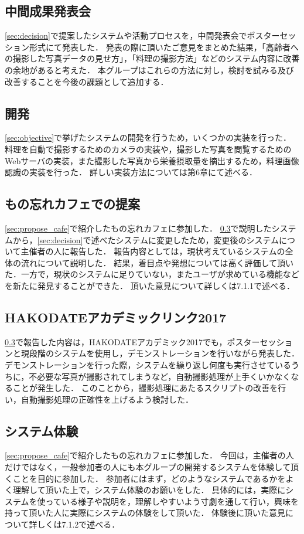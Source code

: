 \documentclass[../report]{subfiles}
\begin{document}
    \subsection{中間成果発表会}
    \ref{sec:decision}で提案したシステムや活動プロセスを，中間発表会でポスターセッション形式にて発表した．
    発表の際に頂いたご意見をまとめた結果，「高齢者への撮影した写真データの見せ方」，「料理の撮影方法」などのシステム内容に改善の余地があると考えた．
    本グループはこれらの方法に対し，検討を試みる及び改善することを今後の課題として追加する．
    
    \subsection{開発}
    \ref{sec:objective}で挙げたシステムの開発を行うため，いくつかの実装を行った．
    料理を自動で撮影するためのカメラの実装や，撮影した写真を閲覧するためのWebサーバの実装，また撮影した写真から栄養摂取量を摘出するため，料理画像認識の実装を行った．
    詳しい実装方法については第6章にて述べる．
    
    \subsection{もの忘れカフェでの提案} \label{sec:propose_cafe2}
    \ref{sec:propose_cafe}で紹介したもの忘れカフェに参加した．
    \ref{sec:propose_cafe2}で説明したシステムから，\ref{sec:decision}で述べたシステムに変更したため，変更後のシステムについて主催者の人に報告した．
    報告内容としては，現状考えているシステムの全体の流れについて説明した．
    結果，着目点や発想については高く評価して頂いた．一方で，現状のシステムに足りていない，またユーザが求めている機能などを新たに発見することができた．
    頂いた意見について詳しくは7.1.1で述べる．
    
    \subsection{HAKODATEアカデミックリンク2017}
    \ref{sec:propose_cafe2}で報告した内容は，HAKODATEアカデミック2017でも，ポスターセッションと現段階のシステムを使用し，デモンストレーションを行いながら発表した．
    デモンストレーションを行った際，システムを繰り返し何度も実行させているうちに，不必要な写真が撮影されてしまうなど，自動撮影処理が上手くいかなくなることが発生した．
    このことから，撮影処理にあたるスクリプトの改善を行い，自動撮影処理の正確性を上げるよう検討した．
    
    \subsection{システム体験}
    \ref{sec:propose_cafe}で紹介したもの忘れカフェに参加した．
    今回は，主催者の人だけではなく，一般参加者の人にも本グループの開発するシステムを体験して頂くことを目的に参加した．
    参加者にはまず，どのようなシステムであるかをよく理解して頂いた上で，システム体験のお願いをした．
    具体的には，実際にシステムを使っている様子や説明を，理解しやすいよう寸劇を通して行い，興味を持って頂いた人に実際にシステムの体験をして頂いた．
    体験後に頂いた意見について詳しくは7.1.2で述べる．
    
    
\end{document}
